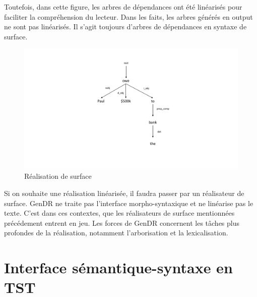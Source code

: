 Toutefois, dans cette figure, les arbres de dépendances ont été linéarisés pour faciliter la compréhension du lecteur. Dans les faits, les arbres générés en output ne sont pas linéarisés. Il s'agit toujours d'arbres de dépendances en syntaxe de surface. 

\begin{figure}[htb]
	\centering
	\includegraphics[width=1\textwidth, trim = {0cm 2cm 0cm 2cm},clip]{ch3/figs/realsurfex.pdf}
	\caption{Réalisation de surface}
	\label{fig:realsurfex}
\end{figure}

Si on souhaite une réalisation linéarisée,  il faudra passer par un réalisateur de surface. GenDR ne traite pas l'interface morpho-syntaxique et ne linéarise pas le texte. C'est dans ces contextes, que les réalisateurs de surface mentionnées précédement entrent en jeu. Les forces de GenDR concernent les tâches plus profondes de la réalisation, notamment l'arborisation et la lexicalisation.


\section{Interface sémantique-syntaxe en TST}\label{secsemsynt}


